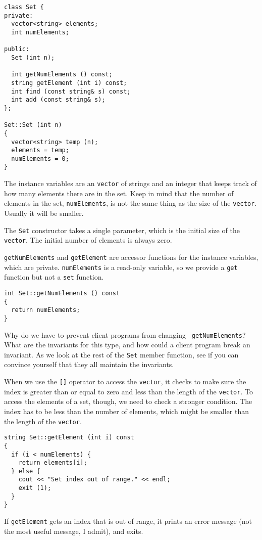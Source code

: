 \begin{verbatim}
class Set {
private:
  vector<string> elements;
  int numElements;

public:
  Set (int n);

  int getNumElements () const;
  string getElement (int i) const;
  int find (const string& s) const;
  int add (const string& s);
};

Set::Set (int n)
{
  vector<string> temp (n);
  elements = temp;
  numElements = 0;
}
\end{verbatim}
%
The instance variables are an {\tt vector} of strings and an
integer that keeps track of how many elements there are in the
set.  Keep in mind that the number of elements in the
set, {\tt numElements}, is not the same thing as the size
of the {\tt vector}.  Usually it will be smaller.


The {\tt Set} constructor takes a single parameter, which is
the initial size of the {\tt vector}.  The initial number
of elements is always zero.

{\tt getNumElements} and {\tt getElement} are accessor functions
for the instance variables, which are private.  {\tt numElements}
is a read-only variable, so we provide a {\tt get} function
but not a {\tt set} function.

\begin{verbatim}
int Set::getNumElements () const
{
  return numElements;
}
\end{verbatim}
%
Why do we have to prevent client programs from changing {\tt
getNumElements}?  What are the invariants for this type, and
how could a client program break an invariant.  As we look
at the rest of the {\tt Set} member function, see if you can
convince yourself that they all maintain the invariants.


When we use the {\tt []} operator to access the {\tt vector},
it checks to make sure the index is greater than or equal to zero
and less than the length of the {\tt vector}.  To access the
elements of a set, though, we need to check a stronger condition.
The index has to be less than the number of elements, which 
might be smaller than the length of the {\tt vector}.

\begin{verbatim}
string Set::getElement (int i) const
{
  if (i < numElements) {
    return elements[i];
  } else {
    cout << "Set index out of range." << endl;
    exit (1);
  }
}
\end{verbatim}
%
If {\tt getElement} gets an index that is out of range, it prints
an error message (not the most useful message, I admit), and
exits.

